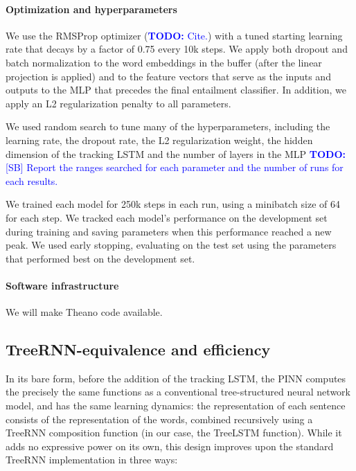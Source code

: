 \documentclass[11pt,letterpaper]{article}
\newcommand\todo[1]{\textcolor{blue}{\textbf{TODO:} #1}}
\begin{document}
\vspace{8em}

\paragraph{Optimization and hyperparameters}

We use the RMSProp optimizer (\todo{Cite.}) with a tuned starting learning rate that decays by a factor of 0.75 every 10k steps. We apply both dropout \cite{srivastava2014dropout} and batch normalization \cite{2015SIoffeCSzegedy} to the word embeddings in the buffer (after the linear projection is applied) and to the feature vectors that serve as the inputs and outputs to the MLP that precedes the final entailment classifier. In addition, we apply an L2 regularization penalty to all parameters.

We used random search to tune many of the hyperparameters, including the learning rate, the dropout rate, the L2 regularization weight, the hidden dimension of the tracking LSTM and the number of layers in the MLP \todo{[SB] Report the ranges searched for each parameter and the number of runs for each results.}

We trained each model for 250k steps in each run, using a minibatch size of 64 for each step. We tracked each model's performance on the development set during training and saving parameters when this performance reached a new peak. We used early stopping, evaluating on the test set using the parameters that performed best on the development set.

\paragraph{Software infrastructure} We will make Theano code available.

\subsection{TreeRNN-equivalence and efficiency}

In its bare form, before the addition of the tracking LSTM, the PINN computes the precisely the same functions as a conventional tree-structured neural network model, and has the same learning dynamics: the representation of each sentence consists of the representation of the words, combined recursively using a TreeRNN composition function (in our case, the TreeLSTM function). While it adds no expressive power on its own, this design improves upon the standard TreeRNN implementation in three ways:
\end{document}
